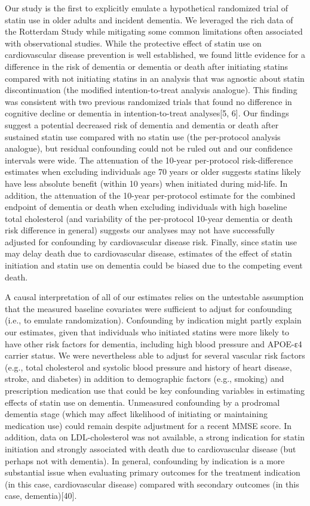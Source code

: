 \documentclass[
]{book}
\begin{document}
Our study is the first to explicitly emulate a hypothetical randomized trial of statin use in older adults and incident dementia. We leveraged the rich data of the Rotterdam Study while mitigating some common limitations often associated with observational studies. While the protective effect of statin use on cardiovascular disease prevention is well established, we found little evidence for a difference in the risk of dementia or dementia or death after initiating statins compared with not initiating statins in an analysis that was agnostic about statin discontinuation (the modified intention-to-treat analysis analogue). This finding was consistent with two previous randomized trials that found no difference in cognitive decline or dementia in intention-to-treat analyses{[}5, 6{]}. Our findings suggest a potential decreased risk of dementia and dementia or death after sustained statin use compared with no statin use (the per-protocol analysis analogue), but residual confounding could not be ruled out and our confidence intervals were wide. The attenuation of the 10-year per-protocol risk-difference estimates when excluding individuals age 70 years or older suggests statins likely have less absolute benefit (within 10 years) when initiated during mid-life. In addition, the attenuation of the 10-year per-protocol estimate for the combined endpoint of dementia or death when excluding individuals with high baseline total cholesterol (and variability of the per-protocol 10-year dementia or death risk difference in general) suggests our analyses may not have successfully adjusted for confounding by cardiovascular disease risk. Finally, since statin use may delay death due to cardiovascular disease, estimates of the effect of statin initiation and statin use on dementia could be biased due to the competing event death.

A causal interpretation of all of our estimates relies on the untestable assumption that the measured baseline covariates were sufficient to adjust for confounding (i.e., to emulate randomization). Confounding by indication might partly explain our estimates, given that individuals who initiated statins were more likely to have other risk factors for dementia, including high blood pressure and APOE-ε4 carrier status. We were nevertheless able to adjust for several vascular risk factors (e.g., total cholesterol and systolic blood pressure and history of heart disease, stroke, and diabetes) in addition to demographic factors (e.g., smoking) and prescription medication use that could be key confounding variables in estimating effects of statin use on dementia. Unmeasured confounding by a prodromal dementia stage (which may affect likelihood of initiating or maintaining medication use) could remain despite adjustment for a recent MMSE score. In addition, data on LDL-cholesterol was not available, a strong indication for statin initiation and strongly associated with death due to cardiovascular disease (but perhaps not with dementia). In general, confounding by indication is a more substantial issue when evaluating primary outcomes for the treatment indication (in this case, cardiovascular disease) compared with secondary outcomes (in this case, dementia){[}40{]}.
\end{document}
